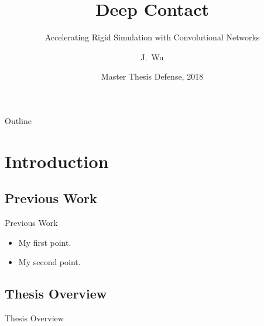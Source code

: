 \documentclass{beamer}
\title{Deep Contact}
\subtitle{Accelerating Rigid Simulation with Convolutional Networks}
\author{J.~Wu}
\institute[University of Copenhagen] %
{
  Department of Computer Science\\
  University of Copenhagen
}
\date{Master Thesis Defense, 2018}
\begin{document}
\begin{frame}
  \titlepage
\end{frame}

\begin{frame}{Outline}
  \tableofcontents
\end{frame}

\section{Introduction}

\subsection{Previous Work}

\begin{frame}{Previous Work}
  \begin{itemize}
  \item {
    My first point.
  }
  \item {
    My second point.
  }
  \end{itemize}
\end{frame}

\subsection{Thesis Overview}

\begin{frame}{Thesis Overview}
\end{frame}
\end{document}
